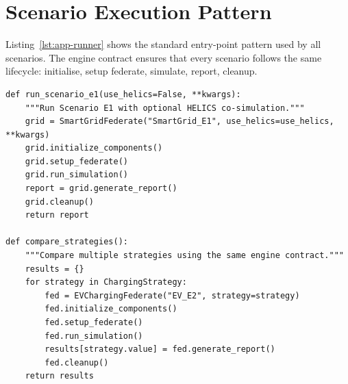 \section{Scenario Execution Pattern}
\label{sec:code-runner}

Listing~\ref{lst:app-runner} shows the standard entry-point pattern used by all scenarios. The engine contract ensures that every scenario follows the same lifecycle: initialise, setup federate, simulate, report, cleanup.

\begin{listing}[H]
\begin{verbatim}
def run_scenario_e1(use_helics=False, **kwargs):
    """Run Scenario E1 with optional HELICS co-simulation."""
    grid = SmartGridFederate("SmartGrid_E1", use_helics=use_helics, **kwargs)
    grid.initialize_components()
    grid.setup_federate()
    grid.run_simulation()
    report = grid.generate_report()
    grid.cleanup()
    return report

def compare_strategies():
    """Compare multiple strategies using the same engine contract."""
    results = {}
    for strategy in ChargingStrategy:
        fed = EVChargingFederate("EV_E2", strategy=strategy)
        fed.initialize_components()
        fed.setup_federate()
        fed.run_simulation()
        results[strategy.value] = fed.generate_report()
        fed.cleanup()
    return results
\end{verbatim}
\caption{Standard scenario execution and strategy comparison pattern}
\label{lst:app-runner}
\end{listing}
